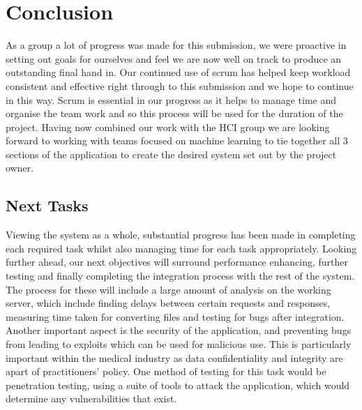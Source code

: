 \section{Conclusion}
As a group a lot of progress was made for this submission, we were proactive in setting out goals for ourselves and feel we are now well on track to produce an outstanding final hand in. Our continued use of scrum has helped keep workload consistent and effective right through to this submission and we hope to continue in this way. Scrum is essential in our progress as it helps to manage time and organise the team work and so this process will be used for the duration of the project. Having now combined our work with the HCI group we are looking forward to working with teams focused on machine learning to tie together all 3 sections of the application to create the desired system set out by the project owner.

\subsection{Next Tasks}
Viewing the system as a whole, substantial progress has been made in completing each required task whilst also managing time for each task appropriately. Looking further ahead, our next objectives will surround performance enhancing, further testing and finally completing the integration process with the rest of the system. The process for these will include a large amount of analysis on the working server, which include finding delays between certain requests and responses, measuring time taken for converting files and testing for bugs after integration. Another important aspect is the security of the application, and preventing bugs from leading to exploits which can be used for malicious use. This is particularly important within the medical industry as data confidentiality and integrity are apart of practitioners' policy. One method of testing for this task would be penetration testing, using a suite of tools to attack the application, which would determine any vulnerabilities that exist.